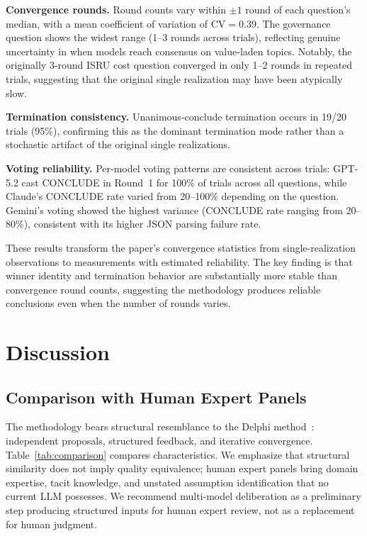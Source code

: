 \documentclass[11pt,a4paper]{article}
\begin{document}
\textbf{Convergence rounds.} Round counts vary within $\pm 1$ round of each question's median, with a mean coefficient of variation of $\text{CV} = 0.39$. The governance question shows the widest range (1--3 rounds across trials), reflecting genuine uncertainty in when models reach consensus on value-laden topics. Notably, the originally 3-round ISRU cost question converged in only 1--2 rounds in repeated trials, suggesting that the original single realization may have been atypically slow.

\textbf{Termination consistency.} Unanimous-conclude termination occurs in 19/20 trials (95\%), confirming this as the dominant termination mode rather than a stochastic artifact of the original single realizations.

\textbf{Voting reliability.} Per-model voting patterns are consistent across trials: GPT-5.2 cast CONCLUDE in Round~1 for 100\% of trials across all questions, while Claude's CONCLUDE rate varied from 20--100\% depending on the question. Gemini's voting showed the highest variance (CONCLUDE rate ranging from 20--80\%), consistent with its higher JSON parsing failure rate.

These results transform the paper's convergence statistics from single-realization observations to measurements with estimated reliability. The key finding is that winner identity and termination behavior are substantially more stable than convergence round counts, suggesting the methodology produces reliable conclusions even when the number of rounds varies.

\section{Discussion}
\label{sec:discussion}

\subsection{Comparison with Human Expert Panels}

The methodology bears structural resemblance to the Delphi method~\cite{linstone1975delphi}: independent proposals, structured feedback, and iterative convergence. Table~\ref{tab:comparison} compares characteristics. We emphasize that structural similarity does not imply quality equivalence; human expert panels bring domain expertise, tacit knowledge, and unstated assumption identification that no current LLM possesses. We recommend multi-model deliberation as a preliminary step producing structured inputs for human expert review, not as a replacement for human judgment.
\end{document}
